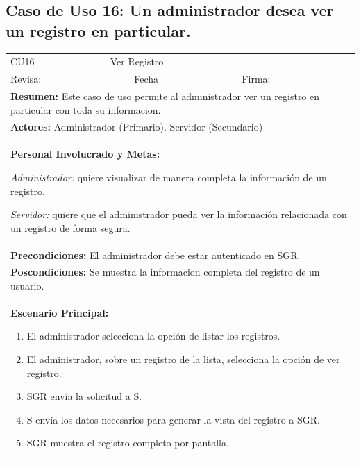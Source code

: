 		\subsection{Caso de Uso 16: Un administrador desea ver un registro en particular.}
			\begin{longtable}{|l|p{5.5cm}|l|p{2cm}|l|p{1.9cm}|} \hline
					\cellcolor{grisOscuro} CU16 & \multicolumn{4}{|l|}{  \cellcolor{grisOscuro} Ver Registro} &  \cellcolor{grisClaro}\multirow{2}{1cm}{} \\ \cline{1-5}
					\cellcolor{grisOscuro} Revisa: &  \cellcolor{grisClaro} &  \cellcolor{grisOscuro} Fecha &  \cellcolor{grisClaro} &  \cellcolor{grisOscuro} Firma: & \cellcolor{grisClaro} \\ \hline
					\multicolumn{6}{|p{15cm}|}{ \textbf{Resumen: } Este caso de uso permite al administrador ver un registro en particular con toda su informacion.

					} \\ \hline

					\multicolumn{6}{|p{15cm}|}{ \textbf{Actores: } Administrador (Primario). Servidor (Secundario)

					} \\ \hline

					\multicolumn{6}{|p{15cm}|}{ \textbf{Personal Involucrado y Metas: }
					
					\emph{Administrador:} quiere visualizar de manera completa la información de un registro.

					\emph{Servidor:} quiere que el administrador pueda ver la información relacionada con un registro de forma segura.

					} \\ \hline

					\multicolumn{6}{|p{15cm}|}{ \textbf{Precondiciones: } El administrador debe estar autenticado en SGR.

					} \\ \hline

					\multicolumn{6}{|p{15cm}|}{ \textbf{Poscondiciones: } Se muestra la informacion completa del registro de un usuario.

					} \\ \hline

					\multicolumn{6}{|p{15cm}|}{ \textbf{Escenario Principal: }

					\begin{enumerate}
							\item El administrador selecciona la opción de listar los registros.
							\item El administrador, sobre un registro de la lista, selecciona la opción de ver registro.
							\item SGR envía la solicitud a S.
							\item S envía los datos necesarios para generar la vista del registro a SGR.
							\item SGR muestra el registro completo por pantalla.
					\end{enumerate}

}
\end{longtable}
